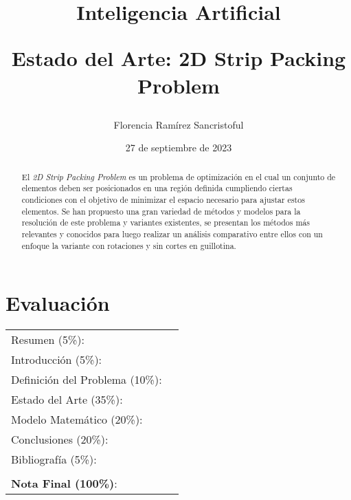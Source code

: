 \documentclass[letter, 10pt]{article}
\begin{document}
\title{Inteligencia Artificial \\ \begin{Large}Estado del Arte: 2D Strip Packing Problem\end{Large}}
\author{Florencia Ram\'irez Sancristoful}
\date{27 de septiembre de 2023}
\maketitle


\section*{Evaluaci\'on}

\begin{tabular}{ll}
Resumen (5\%): & \underline{\hspace{2cm}} \\
Introducci\'on (5\%):  & \underline{\hspace{2cm}} \\
Definici\'on del Problema (10\%):  & \underline{\hspace{2cm}} \\
Estado del Arte (35\%):  & \underline{\hspace{2cm}} \\
Modelo Matem\'atico (20\%): &  \underline{\hspace{2cm}}\\
Conclusiones (20\%): &  \underline{\hspace{2cm}}\\
Bibliograf\'ia (5\%): & \underline{\hspace{2cm}}\\
 &  \\
\textbf{Nota Final (100\%)}:   & \underline{\hspace{2cm}}
\end{tabular}
\vspace{2cm}


\begin{abstract}
    El \emph{2D Strip Packing Problem} es un problema de optimizaci\'on en el cual un conjunto de elementos deben ser posicionados en una regi\'on definida cumpliendo ciertas condiciones con el objetivo de minimizar el espacio necesario para ajustar estos elementos. Se han propuesto una gran variedad de m\'etodos y modelos para la resoluci\'on de este problema y variantes existentes, se presentan los m\'etodos m\'as relevantes y conocidos para luego realizar un an\'alisis comparativo entre ellos con un enfoque la variante con rotaciones y sin cortes en guillotina.
\end{abstract}
\end{document}
